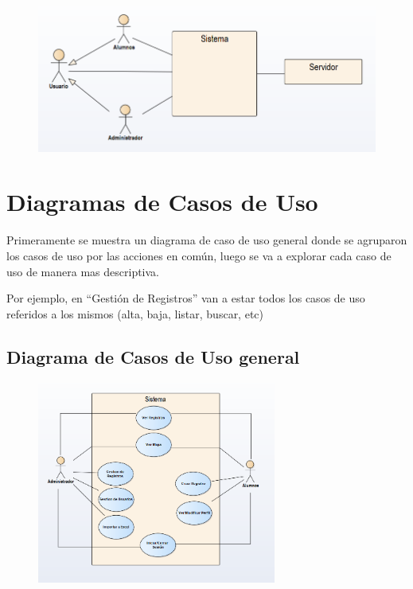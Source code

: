 \begin{figure}[H]
  \centering
   
    \includegraphics[width=1\textwidth]{imagenes/analisis/diagrama-contexto.png}
	\label{fig:casos-de-uso}
\end{figure}

\section{Diagramas de Casos de Uso}

Primeramente se muestra un diagrama de caso de uso general donde se agruparon los casos de uso por las acciones en común, luego se va a explorar cada caso de uso de manera mas descriptiva.

Por ejemplo, en ``Gestión de Registros'' van a estar todos los casos de uso referidos a los mismos (alta, baja, listar, buscar, etc)

\subsection{Diagrama de Casos de Uso general}

\begin{figure}[H]
  \centering
    \includegraphics[width=0.7\textwidth]{imagenes/analisis/casos-uso-general.png}
	\label{fig:casos-de-uso}
\end{figure}

